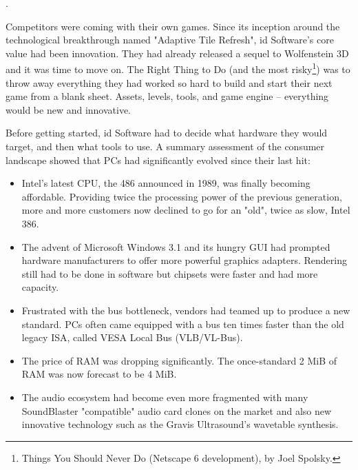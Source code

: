 \par
{}. \\
\par
Competitors were coming with their own games. Since its inception around the technological breakthrough named "Adaptive Tile Refresh", id Software's core value had been innovation. They had already released a sequel to Wolfenstein 3D and it was time to move on. The Right Thing to Do (and the most risky\footnote{Things You Should Never Do (Netscape 6 development), by Joel Spolsky.}) was to throw away everything they had worked so hard to build and start their next game from a blank sheet. Assets, levels, tools, and game engine -- everything would be new and innovative.\\
\par
Before getting started, id Software had to decide what hardware they would target, and then what tools to use. A summary assessment of the consumer landscape showed that PCs had significantly evolved since their last hit:
\begin{itemize}
\item Intel's latest CPU, the 486 announced in 1989, was finally becoming affordable. Providing twice the processing power of the previous generation, more and more customers now declined to go for an "old", twice as slow, Intel 386. 
\item The advent of Microsoft Windows 3.1 and its hungry GUI had prompted hardware manufacturers to offer more powerful graphics adapters. Rendering still had to be done in software but chipsets were faster and had more capacity.
\item Frustrated with the bus bottleneck, vendors had teamed up to produce a new standard. PCs often came equipped with a bus ten times faster than the old legacy ISA, called VESA Local Bus (VLB/VL-Bus). 
\item The price of RAM was dropping significantly. The once-standard 2 MiB of RAM was now forecast to be 4 MiB.
\item The audio ecosystem had become even more fragmented with many SoundBlaster "compatible" audio card clones on the market and also new innovative technology such as the Gravis Ultrasound's wavetable synthesis.\\
\end{itemize}
 \par 
